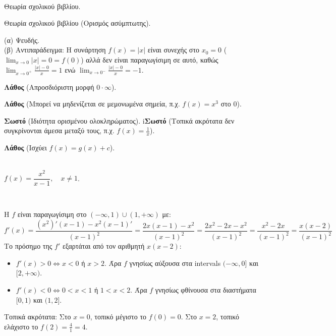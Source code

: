\documentclass[11pt,a4paper,modern,B]{FFExam}
\begin{document}

\begin{thema}
\item\mbox{}\\
\begin{erwthma}
\item Θεωρία σχολικού βιβλίου.
\item Θεωρία σχολικού βιβλίου (Ορισμός ασύμπτωτης).
\item (α) Ψευδής.\\
(β) Αντιπαράδειγμα: Η συνάρτηση $f(x) = |x|$ είναι συνεχής στο $x_0 = 0$ ($\lim_{x \to 0} |x| = 0 = f(0)$) αλλά δεν είναι παραγωγίσιμη σε αυτό, καθώς $\lim_{x \to 0^+} \frac{|x|-0}{x} = 1$ ενώ $\lim_{x \to 0^-} \frac{|x|-0}{x} = -1$.
\item 
\begin{alist}
\item \textbf{Λάθος} (Απροσδιόριστη μορφή $0 \cdot \infty$).
\item \textbf{Λάθος} (Μπορεί να μηδενίζεται σε μεμονωμένα σημεία, π.χ. $f(x)=x^3$ στο $0$).
\item \textbf{Σωστό} (Ιδιότητα ορισμένου ολοκληρώματος).
i\textbf{Σωστό} (Τοπικά ακρότατα δεν συγκρίνονται άμεσα μεταξύ τους, π.χ. $f(x) = \frac{1}{x}$).
\item \textbf{Λάθος} (Ισχύει $f(x) = g(x) + c$).
\end{alist}
\item\mbox{}\\
$f(x) = \dfrac{x^2}{x-1}, \quad x \neq 1$.
\end{erwthma}
\item\mbox{}\\
\begin{erwthma}
\item Η $f$ είναι παραγωγίσιμη στο $(-\infty, 1) \cup (1, +\infty)$ με:
$$ f'(x) = \dfrac{(x^2)'(x-1) - x^2(x-1)'}{(x-1)^2} = \dfrac{2x(x-1) - x^2}{(x-1)^2} = \dfrac{2x^2 - 2x - x^2}{(x-1)^2} = \dfrac{x^2 - 2x}{(x-1)^2} = \dfrac{x(x-2)}{(x-1)^2} $$
Το πρόσημο της $f'$ εξαρτάται από τον αριθμητή $x(x-2)$:
\begin{itemize}
    \item $f'(x) > 0 \Leftrightarrow x < 0$ ή $x > 2$. Άρα $f$ γνησίως αύξουσα στα intervals $(-\infty, 0]$ και $[2, +\infty)$.
    \item $f'(x) < 0 \Leftrightarrow 0 < x < 1$ ή $1 < x < 2$. Άρα $f$ γνησίως φθίνουσα στα διαστήματα $[0, 1)$ και $(1, 2]$.
\end{itemize}
Τοπικά ακρότατα:
Στο $x = 0$, τοπικό μέγιστο το $f(0) = 0$.
Στο $x = 2$, τοπικό ελάχιστο το $f(2) = \frac{4}{1} = 4$.


\end{erwthma}
\end{thema}
\end{document}
